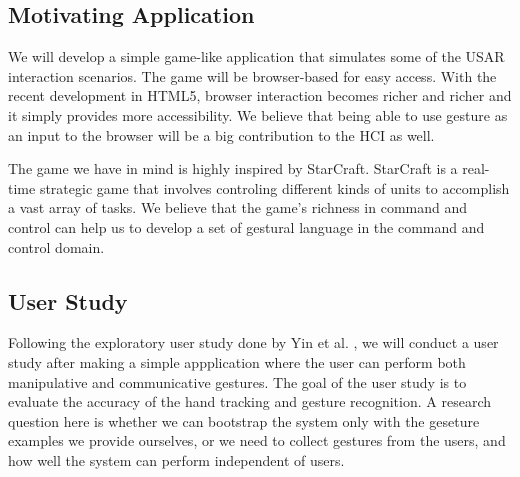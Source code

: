 \subsection{Motivating Application}
We will develop a simple game-like application that simulates some of the USAR
interaction scenarios. The game will be browser-based for easy access. With the
recent development in HTML5, browser interaction becomes richer and richer and
it simply provides more accessibility. We believe that being able to use gesture
as an input to the browser will be a big contribution to the HCI as well.

The game we have in mind is highly inspired by StarCraft. StarCraft is a
real-time strategic game that involves controling different kinds of units to
accomplish a vast array of tasks. We believe that the game's richness in command
and control can help us to develop a set of gestural language in the command and
control domain.

\subsection{User Study}\label{sec:userStudy}
Following the exploratory user study done by Yin et al. \cite{yin10}, we will
conduct a user study after making a simple appplication where the user can
perform both manipulative and communicative gestures. The goal of the user study
is to evaluate the accuracy of the hand tracking and gesture recognition. A
research question here is whether we can bootstrap the system only with the
geseture examples we provide ourselves, or we need to collect gestures from the
users, and how well the system can perform independent of users.

